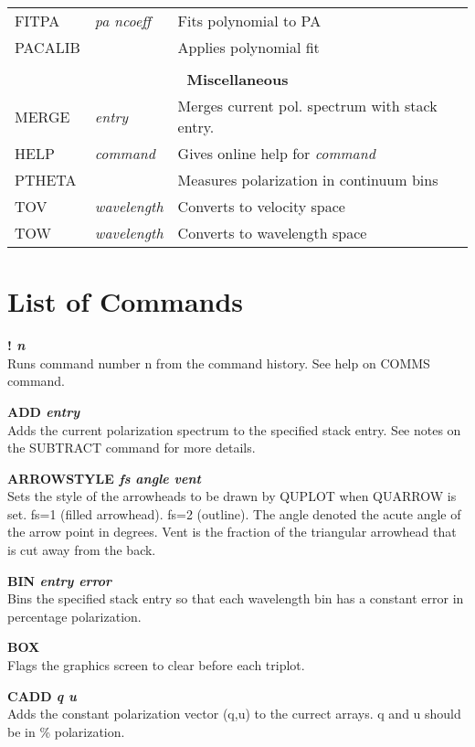 \begin{center}
\begin{tabular}{lll}
FITPA       & {\it pa ncoeff}     & Fits polynomial to PA \\
PACALIB     &                     & Applies polynomial fit \\
\\ 
\multicolumn{3}{c}{\bf Miscellaneous} \\ \hline
MERGE       & {\it entry}         & Merges current pol. spectrum with stack entry. \\
HELP    & {\it command}          & Gives online help for {\it command} \\
PTHETA      &                     & Measures polarization in continuum bins \\
TOV     &  {\it wavelength}      & Converts to velocity space \\
TOW     &  {\it wavelength}      & Converts to wavelength space \\

\end{tabular}
\end{center}

\newpage
\section{List of Commands}

{\bf ! \it n} \\
Runs command number n from the command history. See help on COMMS command.

{\bf ADD \it entry } \\
Adds the current polarization spectrum to the specified stack entry. See notes
on the  SUBTRACT command for more details.

{\bf ARROWSTYLE \it fs angle vent} \\
Sets the style of the arrowheads to be drawn by QUPLOT when QUARROW is
set.  fs=1 (filled arrowhead). fs=2 (outline). The angle denoted the
acute angle of the arrow point in degrees. Vent is the fraction of the
triangular arrowhead that is cut away from the back.

{\bf BIN \it entry error} \\
Bins the specified stack entry so that each wavelength bin has a
constant error in percentage polarization.

{\bf BOX} \\
Flags the graphics screen to clear before each triplot.

{\bf CADD \it q u} \\
Adds the constant polarization vector (q,u) to the currect arrays. q and u
should be in \% polarization.

